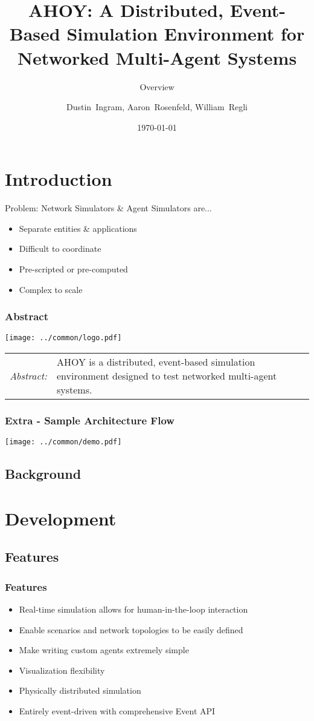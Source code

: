\documentclass[mathserif,usenames,dvipsnames]{beamer}
\title[AHOY: Slide \insertframenumber/\inserttotalframenumber]{AHOY: A Distributed, Event-Based Simulation Environment for Networked Multi-Agent Systems}
\subtitle{Overview}
\author[Ingram \& Rosenfeld]{ 
Dustin~Ingram, Aaron~Rosenfeld, William~Regli}
\institute{
    Drexel University Department of Computer Science, Philadelphia PA\\
}
\date{\today}
\begin{document}
\frame{\titlepage} 

\section{Introduction}
\frame
{
    Problem: Network Simulators \& Agent Simulators are... 
    \begin{itemize}
        \item Separate entities \& applications
        \item Difficult to coordinate
        \item Pre-scripted or pre-computed
        \item Complex to scale
    \end{itemize}
}

\frame
{   
    \frametitle{Abstract}
    \begin{center}
        \texttt{[image: ../common/logo.pdf]}
    \end{center}
    \begin{tabular}{l p{8cm}}
        \textit{Abstract:} & AHOY is a distributed, event-based simulation environment designed to test networked multi-agent systems. \\
    \end{tabular}
}

\frame
{
    \frametitle{Extra - Sample Architecture Flow}
    \begin{center}
        \texttt{[image: ../common/demo.pdf]}
    \end{center}
}


\subsection{Background}
\section{Development}
\subsection{Features}
\frame
{
    \frametitle{Features}
    \begin{itemize}
        \item Real-time simulation allows for human-in-the-loop interaction
        \item Enable scenarios and network topologies to be easily defined
        \item Make writing custom agents extremely simple
        \item Visualization flexibility
        \item Physically distributed simulation
        \item Entirely event-driven with comprehensive Event API
    \end{itemize}
}
\end{document}
